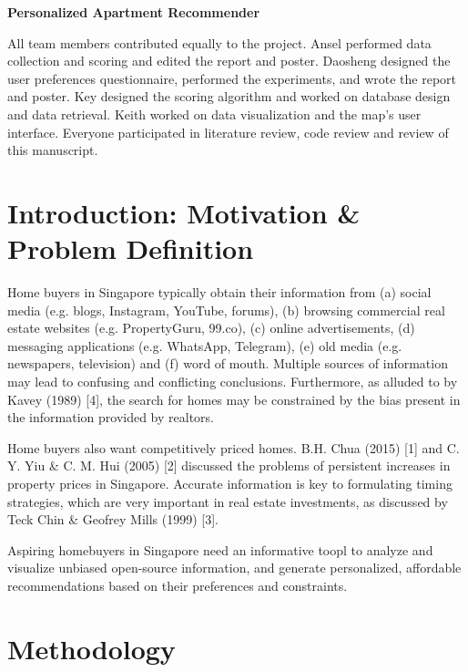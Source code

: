 \documentclass[a4paper, 11pt]{article}
\begin{document}
	\begin{center}
		\sc\large\textbf{Personalized Apartment Recommender}\\
	\end{center}

{All team members contributed equally to the project. Ansel performed data collection and scoring and edited the report and poster. Daosheng designed the user preferences questionnaire, performed the experiments, and wrote the report and poster. Key designed the scoring algorithm and worked on database design and data retrieval. Keith worked on data visualization and the map's user interface. Everyone participated in literature review, code review and review of this manuscript.}

	\section{Introduction: Motivation \& Problem Definition}
	
	Home buyers in Singapore typically obtain their information from (a) social media (e.g. blogs, Instagram, YouTube, forums), (b) browsing commercial real estate websites (e.g. PropertyGuru, 99.co), (c) online advertisements, (d) messaging applications (e.g. WhatsApp, Telegram), (e) old media (e.g. newspapers, television) and (f) word of mouth. Multiple sources of information may lead to confusing and conflicting conclusions. Furthermore, as alluded to by Kavey (1989) [4], the search for homes may be constrained by the bias present in the information provided by realtors.
	
	Home buyers also want competitively priced homes. B.H. Chua (2015) [1] and C. Y. Yiu \& C. M. Hui (2005) [2] discussed the problems of persistent increases in property prices in Singapore. Accurate information is key to formulating timing strategies, which are very important in real estate investments, as discussed by Teck Chin \& Geofrey Mills (1999) [3].

 Aspiring homebuyers in Singapore need an informative toopl to analyze and visualize unbiased open-source information, and generate personalized, affordable recommendations based on their preferences and constraints.

	\section{Methodology}
	
\end{document}
